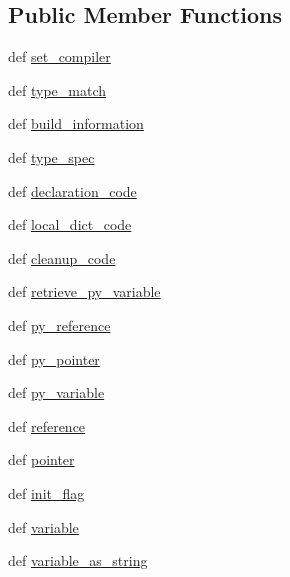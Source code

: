 \subsection*{Public Member Functions}
\begin{DoxyCompactItemize}
\item 
def \hyperlink{classscipy_1_1weave_1_1base__spec_1_1base__converter_ae29a1a67a52fbdb0931dff9bc1a55e25}{set\+\_\+compiler}
\item 
def \hyperlink{classscipy_1_1weave_1_1base__spec_1_1base__converter_ad80d93143dfd23bc993bb02f6477e523}{type\+\_\+match}
\item 
def \hyperlink{classscipy_1_1weave_1_1base__spec_1_1base__converter_a844adfcc5c628b42d28a45f22bd0c9b6}{build\+\_\+information}
\item 
def \hyperlink{classscipy_1_1weave_1_1base__spec_1_1base__converter_a2634d93738d4ee6e520bd150f804fa06}{type\+\_\+spec}
\item 
def \hyperlink{classscipy_1_1weave_1_1base__spec_1_1base__converter_a9e12f2dacd525de9f2a38ada2eb1e1ac}{declaration\+\_\+code}
\item 
def \hyperlink{classscipy_1_1weave_1_1base__spec_1_1base__converter_aaffc363381e079307d4583d97260e663}{local\+\_\+dict\+\_\+code}
\item 
def \hyperlink{classscipy_1_1weave_1_1base__spec_1_1base__converter_a13a0620ab55a3d734d26c0777500139c}{cleanup\+\_\+code}
\item 
def \hyperlink{classscipy_1_1weave_1_1base__spec_1_1base__converter_a6543696a967aec5294410bbea0aea0a1}{retrieve\+\_\+py\+\_\+variable}
\item 
def \hyperlink{classscipy_1_1weave_1_1base__spec_1_1base__converter_a2b75900fb895eb453d8dbe50f5e5c8eb}{py\+\_\+reference}
\item 
def \hyperlink{classscipy_1_1weave_1_1base__spec_1_1base__converter_a0f4dadd916aaa988e9f5b47524b2d16d}{py\+\_\+pointer}
\item 
def \hyperlink{classscipy_1_1weave_1_1base__spec_1_1base__converter_abb81c20c63575314f04141b5f87eacbb}{py\+\_\+variable}
\item 
def \hyperlink{classscipy_1_1weave_1_1base__spec_1_1base__converter_adf3be3c4e86ab360cfeac4db9aae64c3}{reference}
\item 
def \hyperlink{classscipy_1_1weave_1_1base__spec_1_1base__converter_a3c0bfde58bb543419231cca9d80a8e72}{pointer}
\item 
def \hyperlink{classscipy_1_1weave_1_1base__spec_1_1base__converter_afa4a072eae11e448ed0eae0d60bfa128}{init\+\_\+flag}
\item 
def \hyperlink{classscipy_1_1weave_1_1base__spec_1_1base__converter_a62f616300e27ad7a9ff76eacb24afa46}{variable}
\item 
def \hyperlink{classscipy_1_1weave_1_1base__spec_1_1base__converter_ab476da6d81567fea2f4fea3a0cedd086}{variable\+\_\+as\+\_\+string}
\end{DoxyCompactItemize}
